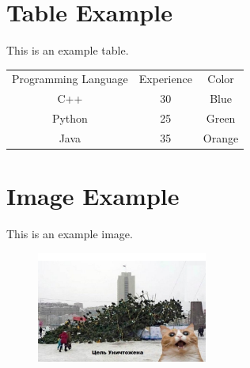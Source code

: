 \documentclass{article}
\begin{document}
\section{Table Example}
This is an example table.
\begin{table}[h]
\centering
\begin{tabular}{|c|c|c|}
\hline
Programming Language & Experience & Color \\
C++ & 30 & Blue \\
Python & 25 & Green \\
Java & 35 & Orange \\
\hline
\end{tabular}\end{table}
\section{Image Example}
This is an example image.
\begin{figure}[h]
\centering
\includegraphics[width=0.5\textwidth]{artifacts/cat.png}
\end{figure}
\end{document}
